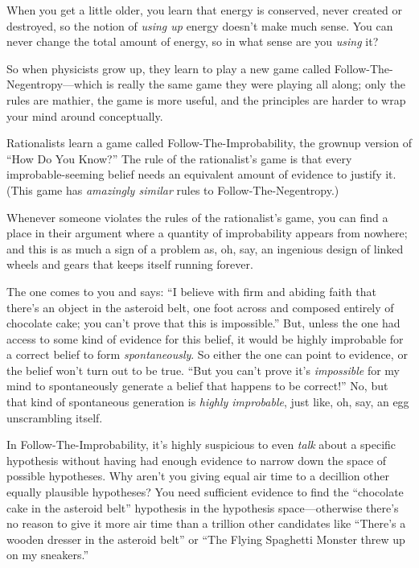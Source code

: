 {
 When you get a little older, you learn that energy is conserved,
never created or destroyed, so the notion of \textit{using up} energy
doesn't make much sense. You can never change the total
amount of energy, so in what sense are you \textit{using} it?}

{
 So when physicists grow up, they learn to play a new game called
Follow-The-Negentropy---which is really the same game they were playing
all along; only the rules are mathier, the game is more useful, and the
principles are harder to wrap your mind around conceptually.}

{
 Rationalists learn a game called Follow-The-Improbability, the
grownup version of ``How Do You
Know?'' The rule of the rationalist's
game is that every improbable-seeming belief needs an equivalent amount
of evidence to justify it. (This game has \textit{amazingly similar}
rules to Follow-The-Negentropy.)}

{
 Whenever someone violates the rules of the
rationalist's game, you can find a place in their
argument where a quantity of improbability appears from nowhere; and
this is as much a sign of a problem as, oh, say, an ingenious design of
linked wheels and gears that keeps itself running forever.}

{
 The one comes to you and says: ``I believe with
firm and abiding faith that there's an object in the
asteroid belt, one foot across and composed entirely of chocolate cake;
you can't prove that this is
impossible.'' But, unless the one had access to some
kind of evidence for this belief, it would be highly improbable for a
correct belief to form \textit{spontaneously}. So either the one can
point to evidence, or the belief won't turn out to be
true. ``But you can't prove
it's \textit{impossible} for my mind to spontaneously
generate a belief that happens to be correct!'' No,
but that kind of spontaneous generation is \textit{highly improbable},
just like, oh, say, an egg unscrambling itself.}

{
 In Follow-The-Improbability, it's highly
suspicious to even \textit{talk} about a specific hypothesis without
having had enough evidence to narrow down the space of possible
hypotheses. Why aren't you giving equal air time to a
decillion other equally plausible hypotheses? You need sufficient
evidence to find the ``chocolate cake in the asteroid
belt'' hypothesis in the hypothesis space---otherwise
there's no reason to give it more air time than a
trillion other candidates like
``There's a wooden dresser in the
asteroid belt'' or ``The Flying
Spaghetti Monster threw up on my sneakers.''}

